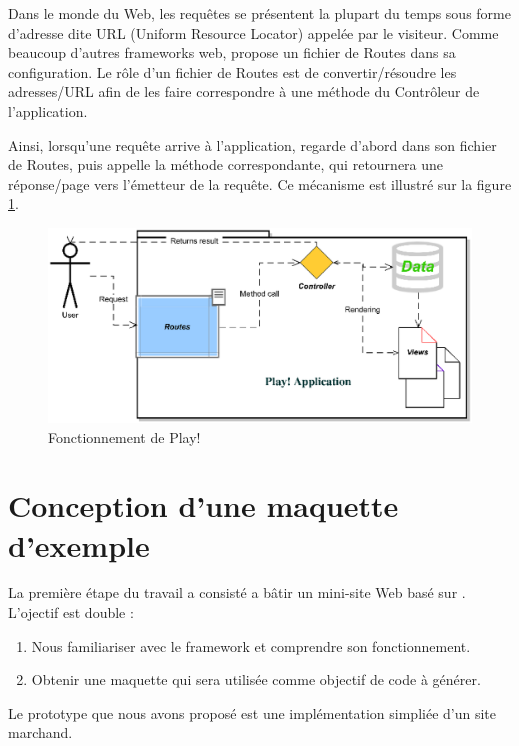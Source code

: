 Dans le monde du Web, les requêtes se présentent la plupart du temps sous forme d'adresse dite URL (Uniform Resource Locator) appelée par le visiteur. Comme beaucoup d'autres frameworks web, \kwplay{} propose un fichier de Routes dans sa configuration. Le rôle d'un fichier de Routes est de convertir/résoudre les adresses/URL afin de les faire correspondre à une méthode du Contrôleur de l'application.

Ainsi, lorsqu'une requête arrive à l'application, \kwplay{} regarde d'abord dans son fichier de Routes, puis appelle la méthode correspondante, qui retournera une réponse/page vers l'émetteur de la requête. Ce mécanisme est illustré sur la figure \ref{fig:play_sch}.

\begin{figure}[htb]
  \centering
  \includegraphics[scale=.8]{img/play_scheme.eps}
  \caption{Fonctionnement de Play!}
  \label{fig:play_sch}
\end{figure}

\section{Conception d’une maquette d’exemple}\label{sec:pro}

La première étape du travail a consisté a bâtir un mini-site Web basé sur \kwplay{}.
\\
L'ojectif est double :
\begin{enumerate}
\item Nous familiariser avec le framework \kwplay{} et comprendre son fonctionnement.
\item Obtenir une maquette qui sera utilisée comme objectif de code à générer.
\end{enumerate}

Le prototype que nous avons proposé est une implémentation simpliée d'un site marchand. 

